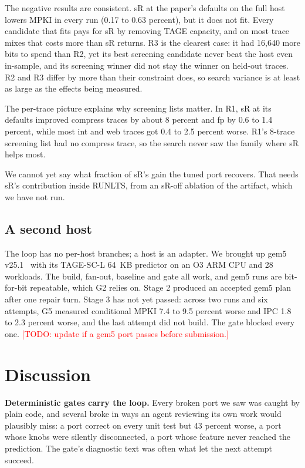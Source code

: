 \documentclass[conference]{IEEEtran}
\newcommand{\todo}[1]{\textcolor{red}{[TODO: #1]}}
\begin{document}
The negative results are consistent. sR at the paper's defaults on the full
host lowers MPKI in every run (0.17 to 0.63 percent), but it does not fit.
Every candidate that fits pays for sR by removing TAGE capacity, and on most
trace mixes that costs more than sR returns. R3 is the clearest case: it had
16,640 more bits to spend than R2, yet its best screening candidate never beat
the host even in-sample, and its screening winner did not stay the winner on
held-out traces. R2 and R3 differ by more than their constraint does, so
search variance is at least as large as the effects being measured.

The per-trace picture explains why screening lists matter. In R1, sR at its
defaults improved compress traces by about 8 percent and fp by 0.6 to 1.4
percent, while most int and web traces got 0.4 to 2.5 percent worse. R1's
8-trace screening list had no compress trace, so the search never saw the
family where sR helps most.

We cannot yet say what fraction of sR's gain the tuned port recovers. That
needs sR's contribution inside RUNLTS, from an sR-off ablation of the
artifact, which we have not run.

\subsection{A second host}

The loop has no per-host branches; a host is an adapter. We brought up gem5
v25.1~\cite{gem5} with its TAGE-SC-L 64~KB predictor on an O3 ARM CPU and 28
workloads. The build, fan-out, baseline and gate all work, and gem5 runs are
bit-for-bit repeatable, which G2 relies on. Stage 2 produced an accepted gem5
plan after one repair turn. Stage 3 has not yet passed: across two runs and six
attempts, G5 measured conditional MPKI 7.4 to 9.5 percent worse and IPC 1.8 to
2.3 percent worse, and the last attempt did not build. The gate blocked every
one. \todo{update if a gem5 port passes before submission.}

\section{Discussion}\label{sec:discussion}

\textbf{Deterministic gates carry the loop.} Every broken port we saw was
caught by plain code, and several broke in ways an agent reviewing its own
work would plausibly miss: a port correct on every unit test but 43 percent
worse, a port whose knobs were silently disconnected, a port whose feature never
reached the prediction. The gate's diagnostic text was often what let the next
attempt succeed.
\end{document}
